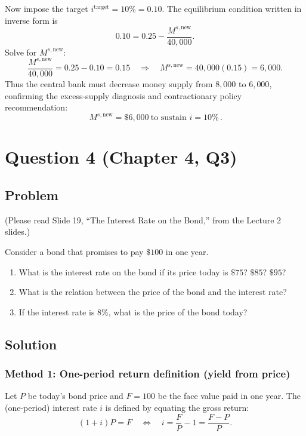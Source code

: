 \documentclass[12pt]{article}
\begin{document}
Now impose the target \(i^{\text{target}}=10\%=0.10\). The equilibrium condition written in inverse form is
\[
0.10 = 0.25-\frac{M^{s,\text{new}}}{40{,}000}.
\]
Solve for \(M^{s,\text{new}}\):
\[
\frac{M^{s,\text{new}}}{40{,}000}=0.25-0.10=0.15
\quad\Longrightarrow\quad
M^{s,\text{new}}=40{,}000(0.15)=6{,}000.
\]
Thus the central bank must decrease money supply from \(8{,}000\) to \(6{,}000\), confirming the excess-supply diagnosis and contractionary policy recommendation:
\[
\boxed{\,M^{s,\text{new}}=\$6{,}000\ \text{to sustain }i=10\%\, }.
\]

\newpage

\section*{Question 4 (Chapter 4, Q3)}
\subsection*{Problem}
(Please read Slide 19, ``The Interest Rate on the Bond,'' from the Lecture 2 slides.)

Consider a bond that promises to pay \(\$100\) in one year.
\begin{enumerate}[label=(\alph*)]
  \item What is the interest rate on the bond if its price today is \(\$75\)? \(\$85\)? \(\$95\)?
  \item What is the relation between the price of the bond and the interest rate?
  \item If the interest rate is \(8\%\), what is the price of the bond today?
\end{enumerate}

\subsection*{Solution}

\subsubsection*{Method 1: One-period return definition (yield from price)}
Let \(P\) be today's bond price and \(F=100\) be the face value paid in one year. The (one-period) interest rate \(i\) is defined by equating the gross return:
\[
(1+i)P = F
\quad\Longleftrightarrow\quad
i = \frac{F}{P}-1=\frac{F-P}{P}.
\]
\end{document}
